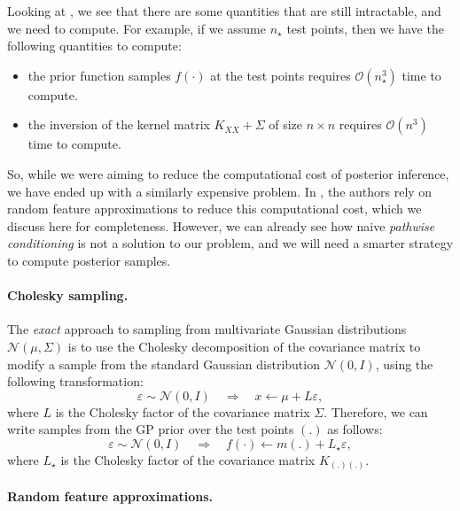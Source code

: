 Looking at , we see that there are some quantities that are still intractable, and we need to compute. For example, if we assume $n_{\star}$ test points, then we have the following quantities to compute: 
\begin{itemize}
    \item the prior function samples $f(\cdot)$ at the test points requires $\mathcal{O}(n_{\star}^3)$ time to compute.
    \item the inversion of the kernel matrix $K_{XX} + \Sigma$ of size $n \times n$ requires $\mathcal{O}(n^3)$ time to compute.
\end{itemize}

So, while we were aiming to reduce the computational cost of posterior inference, we have ended up with a similarly expensive problem. In \textcite{wilson2021pathwise}, the authors rely on random feature approximations to reduce this computational cost, which we discuss here for completeness. However, we can already see how naive \emph{pathwise conditioning} is not a solution to our problem, and we will need a smarter strategy to compute posterior samples.

\paragraph{Cholesky sampling.}

The \emph{exact} approach to sampling from multivariate Gaussian distributions $\mathcal{N}(\mu, \Sigma)$ is to use the Cholesky decomposition of the covariance matrix to modify a sample from the standard Gaussian distribution $\mathcal{N}(0, I)$, using the following transformation:
\[
    \varepsilon \sim \mathcal{N}(0, I) \quad \Rightarrow \quad x \leftarrow \mu + L \varepsilon,
\]
where $L$ is the Cholesky factor of the covariance matrix $\Sigma$. Therefore, we can write samples from the GP prior over the test points $(.)$ as follows:
\[
    \varepsilon \sim \mathcal{N}(0, I) \quad \Rightarrow \quad f(\cdot) \leftarrow m(.) + L_{\star} \varepsilon,
\]
where $L_{\star}$ is the Cholesky factor of the covariance matrix $K_{(.)(.)}$.

\paragraph{Random feature approximations.}

